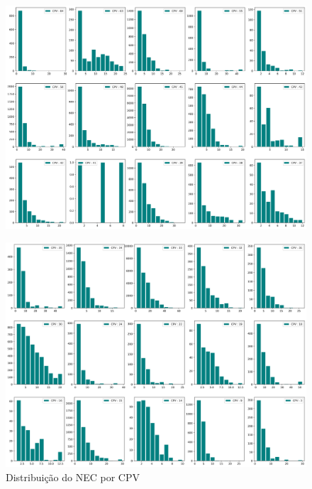 \begin{figure}[H]
	\centering
	\includegraphics[width=\textwidth]{imagens/r019_hist2.png}
\end{figure}

\begin{figure}[H]
	\centering
	\includegraphics[width=\textwidth]{imagens/r019_hist3.png}
	\caption{Distribuição do NEC por CPV}
	\label{}
\end{figure}

